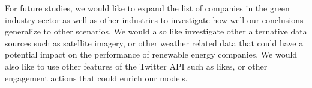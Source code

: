 \documentclass[sigconf, nonacm]{acmart}
\begin{document}
For future studies, we would like to expand the list of companies in the green industry sector as well as other industries to investigate how well our conclusions generalize to other scenarios. We would also like investigate other alternative data sources such as satellite imagery, or other weather related data that could have a potential impact on the performance of renewable energy companies. We would also like to use other features of the Twitter API such as likes, or other engagement actions that could enrich our models. 


\end{document}
